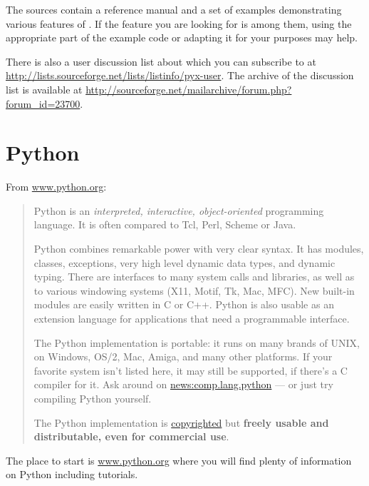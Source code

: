 \documentclass[11pt,DIV14]{scrartcl}
\begin{document}
{}
{The \PyX{} sources contain a reference manual and a set of examples 
demonstrating various features of \PyX. If the feature you are looking for is
among them, using the appropriate part of the example code or adapting it for
your purposes may help.

There is also a user discussion list about \PyX{} which you can subscribe to
at \url{http://lists.sourceforge.net/lists/listinfo/pyx-user}. The archive of
the discussion list is available at \url{http://sourceforge.net/mailarchive/forum.php?forum_id=23700}.
}

\section{Python}

{}
{\label{q:what_is_python}
From \url{www.python.org}:
\begin{quote}
Python is an \textit{interpreted, interactive, object-oriented} programming 
language. It is often compared to Tcl, Perl, Scheme or Java.

Python combines remarkable power with very clear syntax. It has modules, 
classes, exceptions, very high level dynamic data types, and dynamic typing. 
There are interfaces to many system calls and libraries, as well as to various 
windowing systems (X11, Motif, Tk, Mac, MFC). New built-in modules are easily 
written in C or C++. Python is also usable as an extension language for 
applications that need a programmable interface.

The Python implementation is portable: it runs on many brands of UNIX, on 
Windows, OS/2, Mac, Amiga, and many other platforms. If your favorite system 
isn't listed here, it may still be supported, if there's a C compiler for it. 
Ask around on \href{news:comp.lang.python}{news:comp.lang.python} --- or just 
try compiling Python yourself.

The Python implementation is 
\href{http://www.python.org/doc/Copyright.html}{copyrighted} 
but \textbf{freely usable and distributable, even for commercial use}.
\end{quote}
}

{}
{The place to start is \url{www.python.org} where you will find plenty of
information on Python including tutorials.
}
\end{document}

